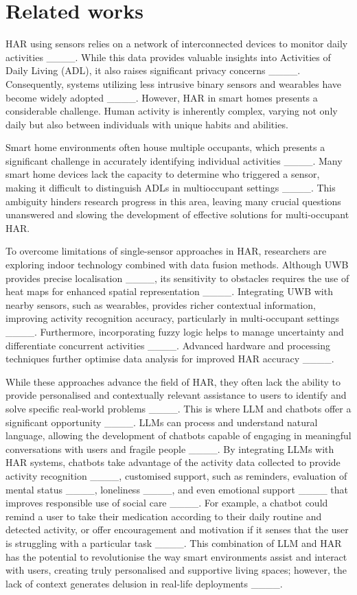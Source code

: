 \section{Related works}
\label{sec:related-works}



HAR using sensors relies on a network of interconnected devices to monitor daily activities ____. While this data provides valuable insights into Activities of Daily Living (ADL), it also raises significant privacy concerns ____. Consequently, systems utilizing less intrusive binary sensors and wearables have become widely adopted ____.  However, HAR in smart homes presents a considerable challenge. Human activity is inherently complex, varying not only daily but also between individuals with unique habits and abilities.

Smart home environments often house multiple occupants, which presents a significant challenge in accurately identifying individual activities ____. Many smart home devices lack the capacity to determine who triggered a sensor, making it difficult to distinguish ADLs in multioccupant settings ____.  This ambiguity hinders research progress in this area, leaving many crucial questions unanswered and slowing the development of effective solutions for multi-occupant HAR.

To overcome limitations of single-sensor approaches in HAR, researchers are exploring indoor technology combined with data fusion methods. Although UWB provides precise localisation ____, its sensitivity to obstacles requires the use of heat maps for enhanced spatial representation ____. Integrating UWB with nearby sensors, such as wearables, provides richer contextual information, improving activity recognition accuracy, particularly in multi-occupant settings ____. Furthermore, incorporating fuzzy logic helps to manage uncertainty and differentiate concurrent activities ____. Advanced hardware and processing techniques further optimise data analysis for improved HAR accuracy ____.

While these approaches advance the field of HAR, they often lack the ability to provide personalised and contextually relevant assistance to users to identify and solve specific real-world problems ____. This is where LLM and chatbots offer a significant opportunity ____. LLMs can process and understand natural language, allowing the development of chatbots capable of engaging in meaningful conversations with users and fragile people ____. By integrating LLMs with HAR systems, chatbots take advantage of the activity data collected to provide activity recognition ____, customised support, such as reminders, evaluation of mental status ____, loneliness ____, and even emotional support ____ that improves responsible use of social care ____. For example, a chatbot could remind a user to take their medication according to their daily routine and detected activity, or offer encouragement and motivation if it senses that the user is struggling with a particular task ____. This combination of LLM and HAR has the potential to revolutionise the way smart environments assist and interact with users, creating truly personalised and supportive living spaces; however, the lack of context generates delusion in real-life deployments ____.

